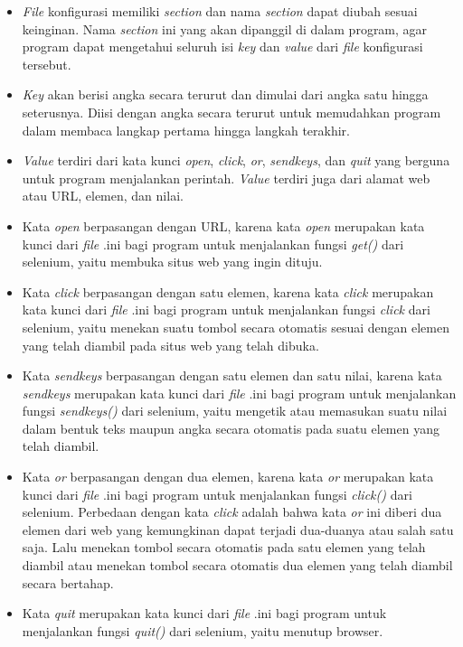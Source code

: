 \begin{itemize}
	\item \textit{File} konfigurasi memiliki \textit{section} dan nama \textit{section} dapat diubah sesuai keinginan. Nama \textit{section} ini yang akan dipanggil di dalam program, agar program dapat mengetahui seluruh isi \textit{key} dan \textit{value} dari \textit{file} konfigurasi tersebut.
	\item \textit{Key} akan berisi angka secara terurut dan dimulai dari angka satu hingga seterusnya. Diisi dengan angka secara terurut untuk memudahkan program dalam membaca langkap pertama hingga langkah terakhir.
	\item \textit{Value} terdiri dari kata kunci \textit{open}, \textit{click}, \textit{or}, \textit{sendkeys}, dan \textit{quit} yang berguna untuk program menjalankan perintah. \textit{Value} terdiri juga dari alamat web atau URL, elemen, dan nilai.
	\item Kata \textit{open} berpasangan dengan URL, karena kata \textit{open} merupakan kata kunci dari \textit{file} .ini bagi program untuk menjalankan fungsi \textit{get()} dari selenium, yaitu membuka situs web yang ingin dituju.
	\item Kata \textit{click} berpasangan dengan satu elemen, karena kata \textit{click} merupakan kata kunci dari \textit{file} .ini bagi program untuk menjalankan fungsi \textit{click} dari selenium, yaitu menekan suatu tombol secara otomatis sesuai dengan elemen yang telah diambil pada situs web yang telah dibuka.
	\item Kata \textit{sendkeys} berpasangan dengan satu elemen dan satu nilai, karena kata \textit{sendkeys} merupakan kata kunci dari \textit{file} .ini bagi program untuk menjalankan fungsi \textit{sendkeys()} dari selenium, yaitu mengetik atau memasukan suatu nilai dalam bentuk teks maupun angka secara otomatis pada suatu elemen yang telah diambil.
	\item Kata \textit{or} berpasangan dengan dua elemen, karena kata \textit{or} merupakan kata kunci dari \textit{file} .ini bagi program untuk menjalankan fungsi \textit{click()} dari selenium. Perbedaan dengan kata \textit{click} adalah bahwa kata \textit{or} ini diberi dua elemen dari web yang kemungkinan dapat terjadi dua-duanya atau salah satu saja. Lalu menekan tombol secara otomatis pada satu elemen yang telah diambil atau menekan tombol secara otomatis dua elemen yang telah diambil secara bertahap.  
	\item Kata \textit{quit} merupakan kata kunci dari \textit{file} .ini bagi program untuk menjalankan fungsi \textit{quit()} dari selenium, yaitu menutup browser.
\end{itemize}



